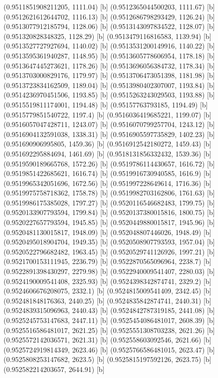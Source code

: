 {{{(0.9511851908211205, 1111.04) [b] 
(0.9512365044500203, 1111.67) [b] 
(0.9512621612644702, 1116.13) [b] 
(0.9512686798293429, 1126.24) [b] 
(0.9513077912185794, 1128.06) [b] 
(0.9513143097834522, 1128.07) [b] 
(0.951320828348325, 1128.29) [b] 
(0.9513479116816583, 1139.94) [b] 
(0.9513527727927694, 1140.02) [b] 
(0.9513531200149916, 1140.22) [b] 
(0.9513595361940287, 1148.95) [b] 
(0.9513605778606954, 1178.18) [b] 
(0.9513647445273621, 1178.26) [b] 
(0.9513696056384732, 1178.34) [b] 
(0.9513703000829176, 1179.97) [b] 
(0.9513706473051398, 1181.98) [b] 
(0.9513723834162509, 1189.04) [b] 
(0.9513980402307007, 1193.84) [b] 
(0.9514236970451506, 1193.85) [b] 
(0.9515263243029503, 1193.88) [b] 
(0.9515519811174001, 1194.48) [b] 
(0.95157763793185, 1194.49) [b] 
(0.9515779851540722, 1197.4) [b] 
(0.9516036419685221, 1199.07) [b] 
(0.9516057047428711, 1243.07) [b] 
(0.9516070799257704, 1243.12) [b] 
(0.9516904132591038, 1338.31) [b] 
(0.9516905597735829, 1402.23) [b] 
(0.951690906995805, 1459.36) [b] 
(0.9516912542180272, 1459.43) [b] 
(0.951692295884694, 1461.69) [b] 
(0.9518131856332432, 1539.36) [b] 
(0.9519590189665768, 1572.26) [b] 
(0.9519786114430657, 1616.72) [b] 
(0.9519851422685621, 1616.74) [b] 
(0.9519916730940585, 1616.9) [b] 
(0.9519965342051696, 1672.56) [b] 
(0.951997228649614, 1716.36) [b] 
(0.9519975758718362, 1758.78) [b] 
(0.9519982703162806, 1761.63) [b] 
(0.9519986175385028, 1797.27) [b] 
(0.9520116546682483, 1799.75) [b] 
(0.9520133907793594, 1799.84) [b] 
(0.9520137380015816, 1800.75) [b] 
(0.9520227657793594, 1945.85) [b] 
(0.9520449880015817, 1945.96) [b] 
(0.9520481130015817, 1948.09) [b] 
(0.952048807446026, 1948.49) [b] 
(0.9520495018904704, 1949.35) [b] 
(0.9520508907793593, 1957.04) [b] 
(0.9520522796682482, 1963.45) [b] 
(0.9520529741126926, 1997.21) [b] 
(0.9521700153111945, 2236.79) [b] 
(0.9522870565096964, 2238.7) [b] 
(0.9522891398430297, 2279.98) [b] 
(0.9522940009541407, 2280.03) [b] 
(0.9524190009541408, 2325.93) [b] 
(0.9524398342874741, 2329.2) [b] 
(0.9524606676208075, 2332.1) [b] 
(0.9524815009541409, 2342.45) [b] 
(0.952481848176363, 2440.25) [b] 
(0.9524835842874741, 2440.31) [b] 
(0.9524839315096963, 2440.43) [b] 
(0.9524842787319185, 2441.08) [b] 
(0.9525245753147683, 2447.11) [b] 
(0.9525454086481017, 2608.39) [b] 
(0.9525516586481017, 2621.25) [b] 
(0.9525551308703238, 2621.26) [b] 
(0.9525572142036571, 2621.31) [b] 
(0.952558603092546, 2621.66) [b] 
(0.9525724919814349, 2623.46) [b] 
(0.9525766586481015, 2623.47) [b] 
(0.9525808253147682, 2623.5) [b] 
(0.9525815197592126, 2623.75) [b] 
(0.952582214203657, 2644.91) [b] 
}}}
